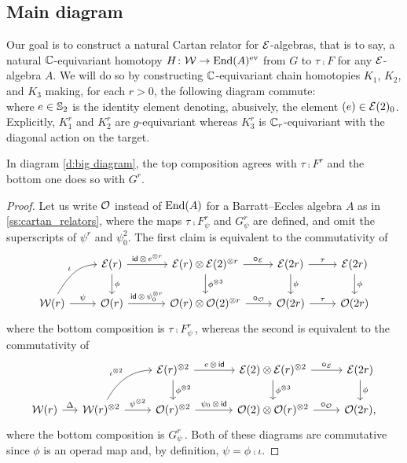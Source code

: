 \subsection{Main diagram}

Our goal is to construct a natural Cartan relator for $\mathcal{E}$-algebras, that is to say, a natural $\mathbb{C}$-equivariant homotopy $H \colon \mathcal{W} \to \mathrm{End}(A)^{\mathrm{ev}}$ from $G$ to $\tau \comp F$ for any $\mathcal{E}$-algebra $A$.
We will do so by constructing $\mathbb{C}$-equivariant chain homotopies $K_1$, $K_2$, and $K_3$ making, for each $r>0$, the following diagram commute:
\begin{equation}\label{d:big diagram}
	
\end{equation}
where $e \in \mathbb{S}_2$ is the identity element denoting, abusively, the element $(e) \in \mathcal{E}(2)_0$.
Explicitly, $K_1^r$ and $K_2^r$ are $g$-equivariant whereas $K_3^r$ is $\mathbb{C}_r$-equivariant with the diagonal action on the target.

\begin{lemma}\label{l:main_diag}
	In diagram \eqref{d:big diagram}, the top composition agrees with $\tau \comp F^r$ and the bottom one does so with $G^r$.
\end{lemma}

\begin{proof}
	Let us write $\mathcal{O}$ instead of $\mathrm{End}(A)$ for a Barratt--Eccles algebra $A$ as in \cref{ss:cartan_relators}, where the maps $\tau \comp F_\psi^r$ and $G_\psi^r$ are defined, and omit the superscripts of $\psi^r$ and $\psi_0^2$.
	The first claim is equivalent to the commutativity of
	\[
	\begin{tikzcd}
		&
		\BE(r) \arrow[d,"\phi"] \arrow[r,"\id\, \ot\, e^{\ot r}"] &[10pt]
		\BE(r) \ot \BE(2)^{\ot r} \arrow[d,"\phi^{\ot 3}"] \arrow[r,"\bcomp_{\BE}"] &
		\BE(2r) \arrow[d,"\phi"] \arrow[r,"\tau"] &
		\BE(2r) \arrow[d,"\phi"] \\
		\cW(r) \arrow[r,"\psi"] \arrow[ur, in=180, out=60,"\iota"] &
		\cO(r) \arrow[r,"\id\, \ot\, \psi_0^{\ot r}"] &
		\cO(r) \ot \cO(2)^{\ot r} \arrow[r,"\bcomp_{\cO}"] &
		\cO(2r) \arrow[r,"\tau"] &
		\cO(2r)
	\end{tikzcd}
	\]
	where the bottom composition is $\tau \comp F_\psi^r$\,, whereas the second is equivalent to the commutativity of
	\[
	\begin{tikzcd}
		&[-10pt] &
		\BE(r)^{\ot2} \arrow[d,"\phi^{\ot 2}"] \arrow[r,"e\,\ot\,\id"] &[10pt]
		\BE(2) \ot \BE(r)^{\ot2} \arrow[d,"\phi^{\ot 3}"] \arrow[r,"\bcomp_{\BE}"] &
		\BE(2r) \arrow[d,"\phi"] \\
		\cW(r) \arrow[r,"\Delta"] &
		\cW(r)^{\ot 2} \arrow[r,"\psi^{\ot 2}"] \arrow[ur, in=180, out=60,"\iota^{\ot 2}"] &
		\cO(r)^{\ot 2} \arrow[r,"\psi_0\,\ot\,\id"] &
		\cO(2) \ot \cO(r)^{\ot 2} \arrow[r,"\bcomp_{\cO}"] &
		\cO(2r),
	\end{tikzcd}
	\]
	where the bottom composition is $G_\psi^r$\,.
	Both of these diagrams are commutative since $\phi$ is an operad map and, by definition, $\psi = \phi \comp \iota$.
\end{proof}

